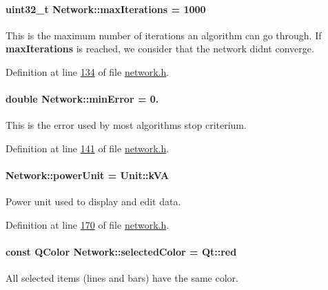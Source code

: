 \paragraph[{max\+Iterations}]{\setlength{\rightskip}{0pt plus 5cm}uint32\+\_\+t Network\+::max\+Iterations = 1000\hspace{0.3cm}{\ttfamily [static]}}\label{group___models_ga318dee060bc577eacd67d332efbbe1b2}
This is the maximum number of iterations an algorithm can go through. If {\bfseries max\+Iterations} is reached, we consider that the network didn\textquotesingle{}t converge. 

Definition at line \hyperlink{network_8h_source_l00134}{134} of file \hyperlink{network_8h_source}{network.\+h}.

\hypertarget{group___models_gabcdc973129d3dda7572b7a1c388da1b5}{}
\paragraph[{min\+Error}]{\setlength{\rightskip}{0pt plus 5cm}double Network\+::min\+Error = 0.\hspace{0.3cm}{\ttfamily [static]}}\label{group___models_gabcdc973129d3dda7572b7a1c388da1b5}
This is the error used by most algorithms stop criterium. 

Definition at line \hyperlink{network_8h_source_l00141}{141} of file \hyperlink{network_8h_source}{network.\+h}.

\hypertarget{group___models_ga9504015bc566f4a3d3b4d4a86000293b}{}
\paragraph[{power\+Unit}]{ Network\+::power\+Unit = {\bf Unit\+::k\+V\+A}\hspace{0.3cm}{\ttfamily [static]}}\label{group___models_ga9504015bc566f4a3d3b4d4a86000293b}
Power unit used to display and edit data. 

Definition at line \hyperlink{network_8h_source_l00170}{170} of file \hyperlink{network_8h_source}{network.\+h}.

\hypertarget{group___models_gaa9e21b8e2a24b0495e776a51e1aeed94}{}
\paragraph[{selected\+Color}]{\setlength{\rightskip}{0pt plus 5cm}const Q\+Color Network\+::selected\+Color = Qt\+::red\hspace{0.3cm}{\ttfamily [static]}}\label{group___models_gaa9e21b8e2a24b0495e776a51e1aeed94}
All selected items (lines and bars) have the same color. 

